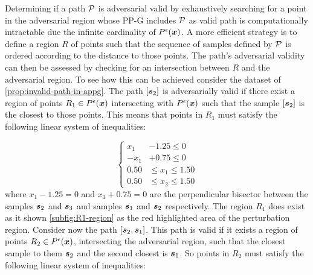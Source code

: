 \noindent Determining if a path $\vpath$ is adversarial valid by exhaustively searching for a point in the adversarial region whose \acs{PP-G} includes $\vpath$ as valid path is computationally intractable due the infinite cardinality of $\pert$. A more efficient strategy is to define a region $R$ of points such that the sequence of samples defined by $\vpath$ is ordered according to the distance to those points. The path's adversarial validity can then be assessed by checking for an intersection between $R$ and the adversarial region. To see how this can be achieved consider the dataset of \autoref{prop:invalid-path-in-appg}. The path $[\sample[2]]$ is adversarially valid if there exist a region of points $R_1 \in\pert$ intersecting with $\pert$ such that the sample $[\sample[2]]$ is the closest to those points. This means that points in $R_1$ must satisfy the following linear system of inequalities:

\[
  \left\{
  \begin{alignedat}{1}
      x_1& - 1.25 \le 0\\
      -x_1& + 0.75 \le 0\\
      0.50& \le x_1 \le 1.50\\
      0.50& \le x_2 \le 1.50
  \end{alignedat}
  \right.
\]
where $x_1 - 1.25 = 0$ and $x_1 + 0.75 = 0$ are the perpendicular bisector between the samples $\sample[2]$ and $\sample[3]$ and samples $\sample[1]$ and $\sample[2]$ respectively. The region $R_1$ does exist as it shown  \autoref{subfig:R1-region} as the red highlighted area of the perturbation region. Consider now the path $[\sample[2], \sample[1]]$. This path is valid if it exists a region of points $R_2 \in \pert$, intersecting the adversarial region, such that the closest sample to them $\sample[2]$ and the second closest is $\sample[1]$. So points in $R_2$ must satisfy the following linear system of inequalities:

